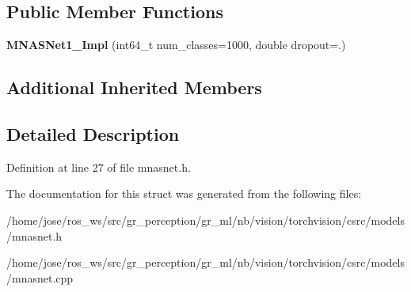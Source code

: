 \subsection*{Public Member Functions}
\begin{DoxyCompactItemize}
\item 
\mbox{\label{structvision_1_1models_1_1MNASNet1__0Impl_a1130d7e0f0d20f249f4830f1bb3d4d47}} 
{\bfseries M\+N\+A\+S\+Net1\+\_\+Impl} (int64\+\_\+t num\+\_\+classes=1000, double dropout=.)
\end{DoxyCompactItemize}
\subsection*{Additional Inherited Members}


\subsection{Detailed Description}


Definition at line 27 of file mnasnet.\+h.



The documentation for this struct was generated from the following files\+:\begin{DoxyCompactItemize}
\item 
/home/jose/ros\+\_\+ws/src/gr\+\_\+perception/gr\+\_\+ml/nb/vision/torchvision/csrc/models/mnasnet.\+h\item 
/home/jose/ros\+\_\+ws/src/gr\+\_\+perception/gr\+\_\+ml/nb/vision/torchvision/csrc/models/mnasnet.\+cpp\end{DoxyCompactItemize}
